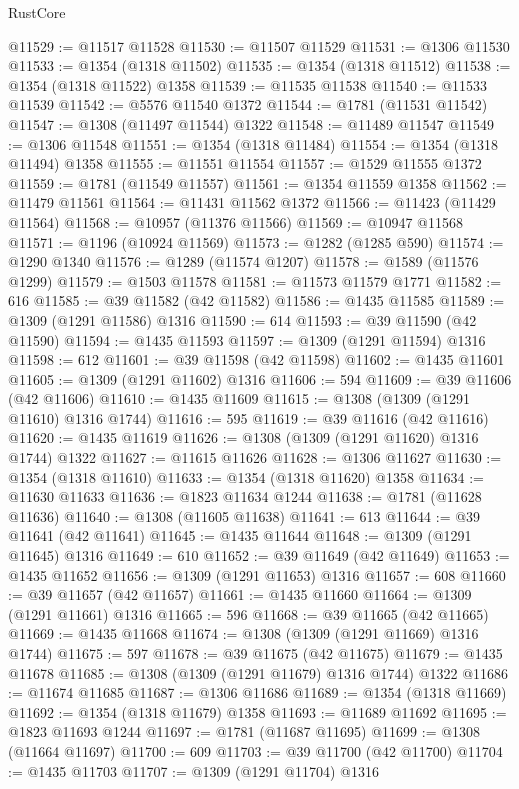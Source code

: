 \begin{lexlean}{RustCore}
\begin{coremodule}
@11529 := @11517 @11528
@11530 := @11507 @11529
@11531 := @1306 @11530
@11533 := @1354 (@1318 @11502)
@11535 := @1354 (@1318 @11512)
@11538 := @1354 (@1318 @11522) @1358
@11539 := @11535 @11538
@11540 := @11533 @11539
@11542 := @5576 @11540 @1372
@11544 := @1781 (@11531 @11542)
@11547 := @1308 (@11497 @11544) @1322
@11548 := @11489 @11547
@11549 := @1306 @11548
@11551 := @1354 (@1318 @11484)
@11554 := @1354 (@1318 @11494) @1358
@11555 := @11551 @11554
@11557 := @1529 @11555 @1372
@11559 := @1781 (@11549 @11557)
@11561 := @1354 @11559 @1358
@11562 := @11479 @11561
@11564 := @11431 @11562 @1372
@11566 := @11423 (@11429 @11564)
@11568 := @10957 (@11376 @11566)
@11569 := @10947 @11568
@11571 := @1196 (@10924 @11569)
@11573 := @1282 (@1285 @590)
@11574 := @1290 @1340
@11576 := @1289 (@11574 @1207)
@11578 := @1589 (@11576 @1299)
@11579 := @1503 @11578
@11581 := @11573 @11579 @1771
@11582 := 616
@11585 := @39 @11582 (@42 @11582)
@11586 := @1435 @11585
@11589 := @1309 (@1291 @11586) @1316
@11590 := 614
@11593 := @39 @11590 (@42 @11590)
@11594 := @1435 @11593
@11597 := @1309 (@1291 @11594) @1316
@11598 := 612
@11601 := @39 @11598 (@42 @11598)
@11602 := @1435 @11601
@11605 := @1309 (@1291 @11602) @1316
@11606 := 594
@11609 := @39 @11606 (@42 @11606)
@11610 := @1435 @11609
@11615 := @1308 (@1309 (@1291 @11610) @1316 @1744)
@11616 := 595
@11619 := @39 @11616 (@42 @11616)
@11620 := @1435 @11619
@11626 := @1308 (@1309 (@1291 @11620) @1316 @1744) @1322
@11627 := @11615 @11626
@11628 := @1306 @11627
@11630 := @1354 (@1318 @11610)
@11633 := @1354 (@1318 @11620) @1358
@11634 := @11630 @11633
@11636 := @1823 @11634 @1244
@11638 := @1781 (@11628 @11636)
@11640 := @1308 (@11605 @11638)
@11641 := 613
@11644 := @39 @11641 (@42 @11641)
@11645 := @1435 @11644
@11648 := @1309 (@1291 @11645) @1316
@11649 := 610
@11652 := @39 @11649 (@42 @11649)
@11653 := @1435 @11652
@11656 := @1309 (@1291 @11653) @1316
@11657 := 608
@11660 := @39 @11657 (@42 @11657)
@11661 := @1435 @11660
@11664 := @1309 (@1291 @11661) @1316
@11665 := 596
@11668 := @39 @11665 (@42 @11665)
@11669 := @1435 @11668
@11674 := @1308 (@1309 (@1291 @11669) @1316 @1744)
@11675 := 597
@11678 := @39 @11675 (@42 @11675)
@11679 := @1435 @11678
@11685 := @1308 (@1309 (@1291 @11679) @1316 @1744) @1322
@11686 := @11674 @11685
@11687 := @1306 @11686
@11689 := @1354 (@1318 @11669)
@11692 := @1354 (@1318 @11679) @1358
@11693 := @11689 @11692
@11695 := @1823 @11693 @1244
@11697 := @1781 (@11687 @11695)
@11699 := @1308 (@11664 @11697)
@11700 := 609
@11703 := @39 @11700 (@42 @11700)
@11704 := @1435 @11703
@11707 := @1309 (@1291 @11704) @1316

\end{coremodule}
\end{lexlean}

